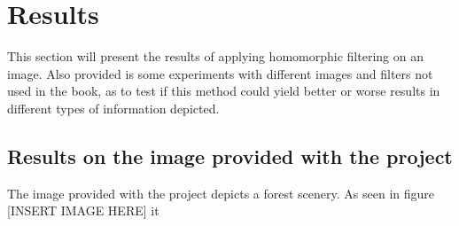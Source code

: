 % 


\section{Results}
	This section will present the results of applying homomorphic filtering
	on an image. Also provided is some experiments with different images
	and filters not used in the book, as to test if this method could yield
	better or worse results in different types of information depicted.
	\subsection{Results on the image provided with the project}
		The image provided with the project depicts a forest scenery. %
		As seen in figure [INSERT IMAGE HERE] it %
		
